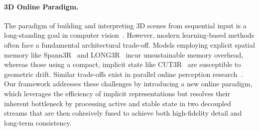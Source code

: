 \paragraph{3D Online Paradigm.}
The paradigm of building and interpreting 3D scenes from sequential input is a long-standing goal in computer vision~\cite{engel2014lsd,forster2016svo,teed2021droid,zhu2024nicer,sun2021neuralrecon,zhang2022nerfusion,wang20243d,wang2025continuous,choy20163d,kar2017learning, chen2025long3r}. However, modern learning-based methods often face a fundamental architectural trade-off. Models employing explicit spatial memory like Spann3R~\cite{wang20243d} and LONG3R~\cite{chen2025long3r} incur unsustainable memory overhead, whereas those using a compact, implicit state like CUT3R~\cite{wang2025continuous} are susceptible to geometric drift. Similar trade-offs exist in parallel online perception research~\cite{liu2022ins,huang2021supervoxel,xu2024memory,zhang2020fusion,xia2025scenepainter,wu2023anyview}. Our framework addresses these challenges by introducing a new online paradigm, which leverages the efficiency of implicit representations but resolves their inherent bottleneck by processing active and stable state in two decoupled streams that are then cohesively fused to achieve both high-fidelity detail and long-term consistency.

